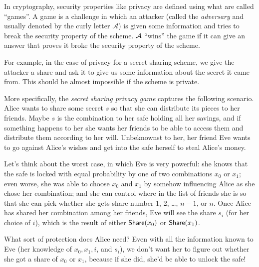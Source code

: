 In cryptography, security properties like privacy are defined using what 
are called ``games''. A game is a challenge in which an attacker (called 
the \emph{adversary} and usually denoted by the curly letter $\mathcal{A}$) is given 
some information and tries to break the security property of the scheme. 
$\mathcal{A}$ ``wins'' the game if it can give an answer that proves it broke 
the security property of the scheme. 

For example, in the case of privacy for a secret sharing scheme, we give 
the attacker a share and ask it to give us some information about the 
secret it came from. This should be almost impossible if the scheme is 
private.

More specifically, the \emph{secret sharing privacy game} captures 
the following scenario. Alice wants to share some secret $s$ so that she
can distribute its pieces to her friends. Maybe $s$ is the combination to
her safe holding all her savings, and if something happens to her she wants
her friends to be able to access them and distribute them according to
her will. Unbeknownst to her, her friend Eve wants to go against Alice's
wishes and get into the safe herself to steal Alice's money.

Let's think about the worst case, in which Eve is very powerful: she knows 
that the safe is locked with equal probability by one of two combinations
$x_0$ or $x_1$; even worse, she was able to choose $x_0$ and $x_1$ by 
somehow influencing Alice as she chose her combination; and she can control
where in the list of friends she is so that she can pick whether she gets
share number 1, 2, \ldots, $n-1$, or $n$. Once Alice has shared her
combination among her friends, Eve will see the share $s_i$ (for her choice
of $i$), which is the result of either $\mathsf{Share}(x_0)$ or $\mathsf{Share}(x_1)$.

What sort of protection does Alice need? Even with all the information 
known to Eve (her knowledge of $x_0, x_1, i$, and $s_i$), we don't want her to figure
out whether she got a share of $x_0$ or $x_1$, because if she did, she'd
be able to unlock the safe!

